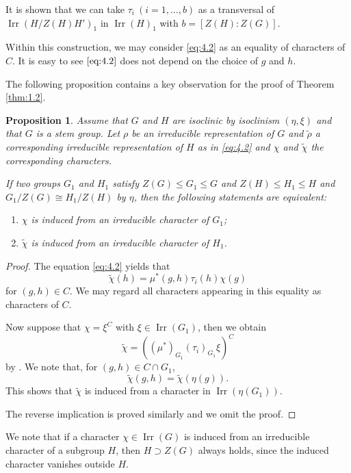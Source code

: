 \documentclass[a4paper,12pt]{article}
\newtheorem{proposition}[theorem]{Proposition}
\theoremstyle{definition}
\theoremstyle{remark}
\DeclareMathOperator{\irr}{Irr}
\numberwithin{equation}{section}
\begin{document}
It is shown that we can take $\tau_i \ (i=1,\ldots, b)$ as a transversal of $\irr (H/Z(H)H')_1$ in $\irr (H)_1$
with $b=[Z (H): Z (G)]$.

Within this construction, we may consider \eqref{eq:4.2} as an equality of characters of $C$. 
It is easy to see $\eqref{eq:4.2}$ does not depend on the choice of $g$ and $h$.

The following proposition contains a key observation for the proof of Theorem \ref{thm:1.2}.

\begin{proposition} \label{prop:4.3}
Assume that $G$ and $H$ are isoclinic by isoclinism $(\eta, \xi)$
and that $G$ is a stem group.
Let $\rho$ be an irreducible representation of $G$ and $\tilde{\rho }$ a corresponding 
irreducible representation of $H$ as in \eqref{eq:4.2} and $\chi$ 
and $\tilde{\chi}$ the corresponding characters.

If two groups $G_1$ and $H_1$ satisfy $Z(G) \le G_1 \le G$ and $Z(H) \le H_1 \le H$
and $G_1/ Z(G) \cong H_1/ Z(H) $ by $\eta$, then the following statements are equivalent: 
\begin{enumerate}
    \item $\chi$ is induced from an irreducible character of $G_1$;
    \item $\tilde{\chi} $ is induced from an irreducible  character of $H_1$.
\end{enumerate}
\end{proposition} 
\begin{proof}
The equation \eqref{eq:4.2} yields that
\[
\tilde{\chi} (h)= \mu^* (g , h) \tau_i (h) \chi (g)  \]
for $(g,h) \in C$. 
We may regard all characters appearing in this equality as characters of $C$.

Now suppose that $\chi  = \xi^C $ with $\xi \in \irr ( G_1 )$,  then we obtain 
\[
\tilde{\chi} = ((\mu^*)_{G_1} (\tau_i)_{G_1} \xi )^C
\]
by \cite[(38.5) Theorem]{MR0144979}.
We note that, for $(g,h) \in C \cap G_1$, 
\[
\tilde{\chi}  (g,h) = \tilde{\chi} (\eta (g)).
\]
This shows that $\tilde{\chi} $ is induced from a character in $\irr (\eta (G_1))$.

The reverse implication is proved similarly and we omit the proof.
\end{proof}

We note that if a character $\chi \in \irr (G)$ is induced from an irreducible 
character of a subgroup $H$, then $H \supset Z(G)$ always holds, since the induced character vanishes
outside $H$.
\end{document}
